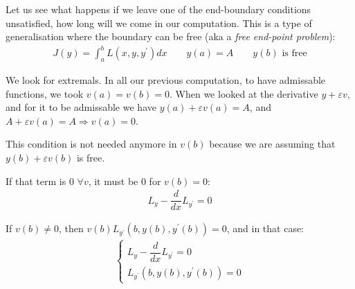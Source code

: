 \par\bigskip
\noindent Let us see what happens if we leave one of the end-boundary conditions unsatisfied, how long will we come in our computation. This is a type of generalisation where the boundary can be free (aka a \textit{free end-point problem}):
\begin{equation*}
  \begin{gathered}
    J(y) = \int_{a}^{b}L(x,y,y^{\prime})dx\qquad y(a) = A\qquad y(b)\text{ is free}
  \end{gathered}
\end{equation*}\par
\noindent We look for extremals. In all our previous computation, to have admissable functions, we took $v(a) = v(b) = 0$. When we looked at the derivative $y+\varepsilon v$, and for it to be admissable we have $y(a)+\varepsilon v(a) = A$, and $A+\varepsilon v(a)=A\Rightarrow v(a) = 0$.\par
\noindent This condition is not needed anymore in $v(b)$ because we are assuming that $y(b)+\varepsilon v(b)$ is free.
\par\bigskip
\noindent If that term is 0 $\forall v$, it must be 0 for $v(b) = 0$:
\begin{equation*}
  \begin{gathered}
    L_y-\dfrac{d}{dx}L_{y^{\prime}} = 0
  \end{gathered}
\end{equation*}\par
\noindent If $v(b)\neq0$, then $v(b)L_{y^{\prime}}(b,y(b), y^{\prime}(b))=0$, and in that case:
\begin{equation*}
  \begin{gathered}
    \begin{cases*}
      L_y-\dfrac{d}{dx}L_{y^{\prime}} = 0\\
      L_{y^{\prime}}(b,y(b),y^{\prime}(b)) = 0
    \end{cases*}
  \end{gathered}
\end{equation*}
